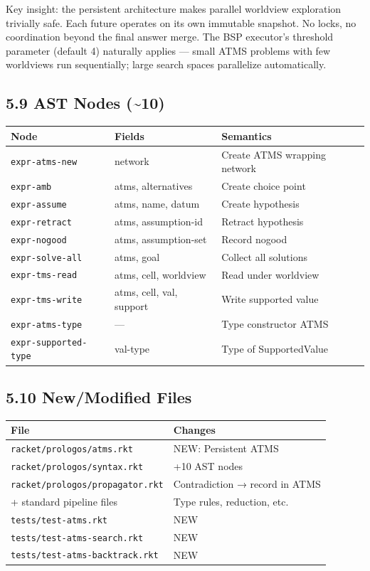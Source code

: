 \documentclass[11pt]{article}
\begin{document}
Key insight: the persistent architecture makes parallel worldview exploration
trivially safe. Each future operates on its own immutable snapshot. No locks,
no coordination beyond the final answer merge. The BSP executor's threshold
parameter (default 4) naturally applies — small ATMS problems with few
worldviews run sequentially; large search spaces parallelize automatically.
\subsection{5.9 AST Nodes (\textasciitilde{}10)}
\label{sec:org30afbdb}

\begin{center}
\begin{tabular}{lll}
Node & Fields & Semantics\\
\hline
\texttt{expr-atms-new} & network & Create ATMS wrapping network\\
\texttt{expr-amb} & atms, alternatives & Create choice point\\
\texttt{expr-assume} & atms, name, datum & Create hypothesis\\
\texttt{expr-retract} & atms, assumption-id & Retract hypothesis\\
\texttt{expr-nogood} & atms, assumption-set & Record nogood\\
\texttt{expr-solve-all} & atms, goal & Collect all solutions\\
\texttt{expr-tms-read} & atms, cell, worldview & Read under worldview\\
\texttt{expr-tms-write} & atms, cell, val, support & Write supported value\\
\texttt{expr-atms-type} & — & Type constructor ATMS\\
\texttt{expr-supported-type} & val-type & Type of SupportedValue\\
\end{tabular}
\end{center}
\subsection{5.10 New/Modified Files}
\label{sec:org67ee51c}

\begin{center}
\begin{tabular}{ll}
File & Changes\\
\hline
\texttt{racket/prologos/atms.rkt} & NEW: Persistent ATMS\\
\texttt{racket/prologos/syntax.rkt} & +10 AST nodes\\
\texttt{racket/prologos/propagator.rkt} & Contradiction → record in ATMS\\
+ standard pipeline files & Type rules, reduction, etc.\\
\texttt{tests/test-atms.rkt} & NEW\\
\texttt{tests/test-atms-search.rkt} & NEW\\
\texttt{tests/test-atms-backtrack.rkt} & NEW\\
\end{tabular}
\end{center}
\end{document}

